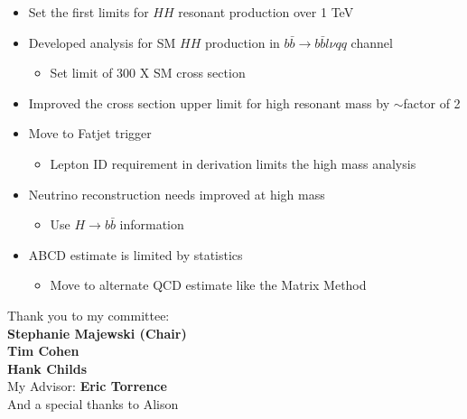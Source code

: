 \documentclass{beamer}
\newcommand*{\header}[1]{\fontsize{16}{8}\selectfont \textbf{{\color{MyPurple}{#1}}}}
\begin{document}
\begin{frame}
\begin{columns}
\begin{column}{0.5\textwidth}
\begin{center}
\end{center}
\end{column}
\end{columns}
\end{frame}

\begin{frame}
\begin{center}
\header{Conclusion}
\end{center}
\begin{itemize}
\item Set the first limits for $HH$ resonant production over 1 TeV
\item Developed analysis for SM $HH$ production in $b\bar{b}\rightarrow{}b\bar{b}l\nu{}qq$ channel
\begin{itemize}
\item Set limit of 300 X SM cross section
\end{itemize}
\item Improved the cross section upper limit for high resonant mass by $\sim$factor of 2
\end{itemize}
\end{frame}

\begin{frame}
\begin{center}
\header{Outlook}
\end{center}
\begin{itemize}
\item Move to Fatjet trigger
\begin{itemize}
\item Lepton ID requirement in derivation limits the high mass analysis
\end{itemize}
\item Neutrino reconstruction needs improved at high mass
\begin{itemize}
\item Use $H\rightarrow{}b\bar{b}$ information
\end{itemize}
\item ABCD estimate is limited by statistics
\begin{itemize}
\item Move to alternate QCD estimate like the Matrix Method
\end{itemize}
\end{itemize}
\end{frame}

\begin{frame}
\begin{center}
Thank you to my committee:\\
\textbf{Stephanie Majewski (Chair)}\\
\textbf{Tim Cohen}\\
\textbf{Hank Childs}\\
My Advisor: \textbf{Eric Torrence}\\
And a special thanks to Alison
\end{center}
\end{frame}
\end{document}
